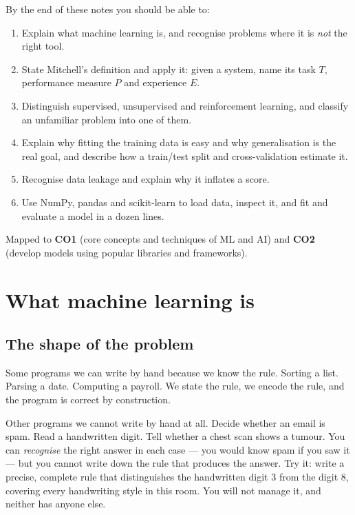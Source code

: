 \documentclass[11pt]{article}
\begin{document}
By the end of these notes you should be able to:

\begin{enumerate}[leftmargin=*]
  \item Explain what machine learning is, and recognise problems where it is
    \emph{not} the right tool.
  \item State Mitchell's definition and apply it: given a system, name its
    task $T$, performance measure $P$ and experience $E$.
  \item Distinguish supervised, unsupervised and reinforcement learning, and
    classify an unfamiliar problem into one of them.
  \item Explain why fitting the training data is easy and why generalisation is
    the real goal, and describe how a train/test split and cross-validation
    estimate it.
  \item Recognise data leakage and explain why it inflates a score.
  \item Use NumPy, pandas and scikit-learn to load data, inspect it, and fit
    and evaluate a model in a dozen lines.
\end{enumerate}

Mapped to \textbf{CO1} (core concepts and techniques of ML and AI) and
\textbf{CO2} (develop models using popular libraries and frameworks).

\newpage
\section{What machine learning is}
\label{sec:whatisml}

\subsection{The shape of the problem}

Some programs we can write by hand because we know the rule. Sorting a list.
Parsing a date. Computing a payroll. We state the rule, we encode the rule, and
the program is correct by construction.

Other programs we cannot write by hand at all. Decide whether an email is spam.
Read a handwritten digit. Tell whether a chest scan shows a tumour. You can
\emph{recognise} the right answer in each case --- you would know spam if you
saw it --- but you cannot write down the rule that produces the answer. Try it:
write a precise, complete rule that distinguishes the handwritten digit 3 from
the digit 8, covering every handwriting style in this room. You will not manage
it, and neither has anyone else.
\end{document}
